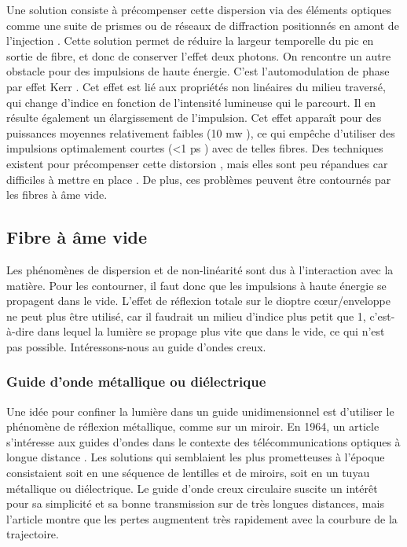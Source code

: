 Une solution consiste à précompenser cette dispersion via des éléments optiques comme une suite de prismes ou de réseaux de diffraction positionnés en amont de l'injection \cite{fork_negative_1984}. Cette solution permet de réduire la largeur temporelle du pic en sortie de fibre, et donc de conserver l'effet deux photons. On rencontre un autre obstacle pour des impulsions de haute énergie. C'est l'automodulation de phase par effet Kerr \cite{agrawal_nonlinear_2000}. Cet effet est lié aux propriétés non linéaires du milieu traversé, qui change d'indice en fonction de l'intensité lumineuse qui le parcourt. Il en résulte également un élargissement de l'impulsion. Cet effet apparaît pour des puissances moyennes relativement faibles (10 mw \cite{helmchen_miniaturization_2013}), ce qui empêche d'utiliser des impulsions optimalement courtes (<1 ps \cite{helmchen_miniaturization_2013}) avec de telles fibres. Des techniques existent pour précompenser cette distorsion \cite{clark_fiber_2001} \cite{lefort_sub-30-fs_2014}, mais elles sont peu répandues car difficiles à mettre en place \cite{helmchen_miniaturization_2013}. De plus, ces problèmes peuvent être contournés par les fibres à âme vide.

\subsection{Fibre à âme vide}

Les phénomènes de dispersion et de non-linéarité sont dus à l'interaction avec la matière. Pour les contourner, il faut donc que les impulsions à haute énergie se propagent dans le vide. L'effet de réflexion totale sur le dioptre cœur/enveloppe ne peut plus être utilisé, car il faudrait un milieu d'indice plus petit que 1, c’est-à-dire dans lequel la lumière se propage plus vite que dans le vide, ce qui n'est pas possible. Intéressons-nous au guide d'ondes creux.

\subsubsection{Guide d'onde métallique ou diélectrique}

Une idée pour confiner la lumière dans un guide unidimensionnel est d'utiliser le phénomène de réflexion métallique, comme sur un miroir. En 1964, un article s'intéresse aux guides d'ondes dans le contexte des télécommunications optiques à longue distance \cite{marcatili_hollow_1964}. Les solutions qui semblaient les plus prometteuses à l'époque consistaient soit en une séquence de lentilles et de miroirs, soit en un tuyau métallique ou diélectrique. Le guide d'onde creux circulaire suscite un intérêt pour sa simplicité et sa bonne transmission sur de très longues distances, mais l'article montre que les pertes augmentent très rapidement avec la courbure de la trajectoire.

